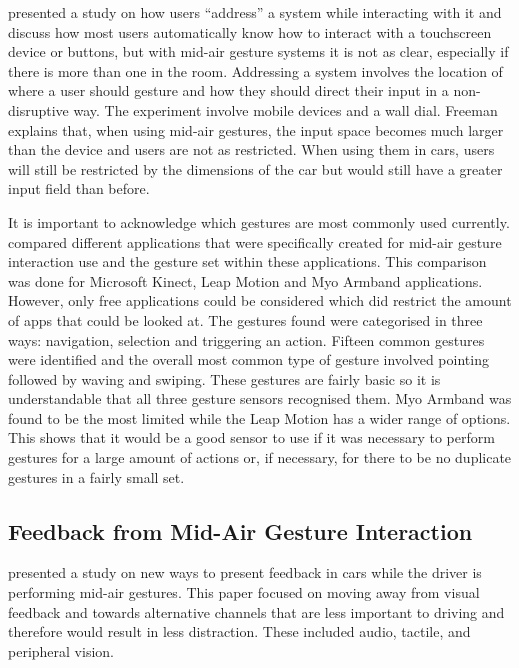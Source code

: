 \documentclass{l4proj}
\begin{document}
\cite{Freeman_Brewster_Lantz_2016} presented a study on how users “address” a system while interacting with it and discuss how most users automatically know how to interact with a touchscreen device or buttons, but with mid-air gesture systems it is not as clear, especially if there is more than one in the room. Addressing a system involves the location of where a user should gesture and how they should direct their input in a non-disruptive way. The experiment involve mobile devices and a wall dial. Freeman explains that, when using mid-air gestures, the input space becomes much larger than the device and users are not as restricted. When using them in cars, users will still be restricted by the dimensions of the car but would still have a greater input field than before. 

It is important to acknowledge which gestures are most commonly used currently. \cite{Cabreira_Hwang_2015} compared different applications that were specifically created for mid-air gesture interaction use and the gesture set within these applications. This comparison was done for Microsoft Kinect, Leap Motion and Myo Armband applications. However, only free applications could be considered which did restrict the amount of apps that could be looked at. The gestures found were categorised in three ways: navigation, selection and triggering an action. Fifteen common gestures were identified and the overall most common type of gesture involved pointing followed by waving and swiping. These gestures are fairly basic so it is understandable that all three gesture sensors recognised them. Myo Armband was found to be the most limited while the Leap Motion has a wider range of options. This shows that it would be a good sensor to use if it was necessary to perform gestures for a large amount of actions or, if necessary, for there to be no duplicate gestures in a fairly small set. 

\subsection{Feedback from Mid-Air Gesture Interaction}
\cite{Shakeri_Williamson_Brewster_2017} presented a study on new ways to present feedback in cars while the driver is performing mid-air gestures. This paper focused on moving away from visual feedback and towards alternative channels that are less important to driving and therefore would result in less distraction. These included audio, tactile, and peripheral vision. 
\end{document}
